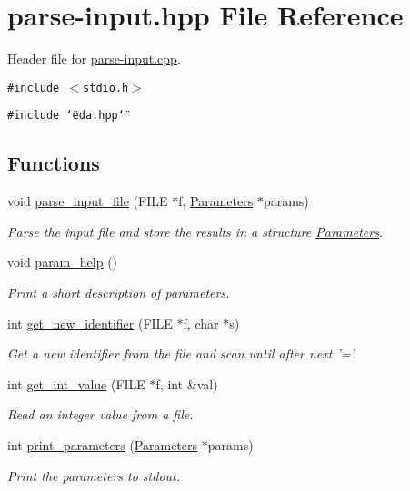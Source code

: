 \hypertarget{parse-input_8hpp}{
\section{parse-input.hpp File Reference}
\label{parse-input_8hpp}
}
Header file for \hyperlink{parse-input_8cpp}{parse-input.cpp}. 

{\tt \#include $<$stdio.h$>$}\par
{\tt \#include \char`\"{}eda.hpp\char`\"{}}\par
\subsection*{Functions}
\begin{CompactItemize}
\item 
void \hyperlink{parse-input_8hpp_ecc496a88afbe998e2577dfe766dbd0e}{parse\_\-input\_\-file} (FILE $\ast$f, \hyperlink{struct_parameters}{Parameters} $\ast$params)
\begin{CompactList}\small\item\em Parse the input file and store the results in a structure \hyperlink{struct_parameters}{Parameters}. \item\end{CompactList}\item 
void \hyperlink{parse-input_8hpp_e30f981622da23c664e95e813953673d}{param\_\-help} ()
\begin{CompactList}\small\item\em Print a short description of parameters. \item\end{CompactList}\item 
int \hyperlink{parse-input_8hpp_e28f089803e889dc1c1412f56f482ee7}{get\_\-new\_\-identifier} (FILE $\ast$f, char $\ast$s)
\begin{CompactList}\small\item\em Get a new identifier from the file and scan until after next '='. \item\end{CompactList}\item 
int \hyperlink{parse-input_8hpp_84d83813df0dc09fd6a2a4fbfc893d03}{get\_\-int\_\-value} (FILE $\ast$f, int \&val)
\begin{CompactList}\small\item\em Read an integer value from a file. \item\end{CompactList}\item 
int \hyperlink{parse-input_8hpp_9d6eb3d840afb4c96f4d0e52e61c3bf7}{print\_\-parameters} (\hyperlink{struct_parameters}{Parameters} $\ast$params)
\begin{CompactList}\small\item\em Print the parameters to stdout. \item\end{CompactList}\end{CompactItemize}


